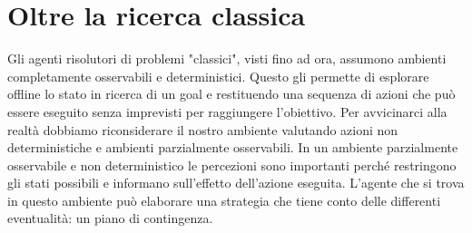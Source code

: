 \documentclass{article}
\begin{document}
\section{Oltre la ricerca classica}
Gli agenti risolutori di problemi "classici", visti fino ad ora, assumono ambienti completamente osservabili e deterministici. Questo gli permette di esplorare offline lo stato in ricerca di un goal e restituendo una sequenza di azioni che può essere eseguito senza imprevisti per raggiungere l'obiettivo. Per avvicinarci alla realtà dobbiamo riconsiderare il nostro ambiente valutando azioni non deterministiche e ambienti parzialmente osservabili. \newline
In un ambiente parzialmente osservabile e non deterministico le percezioni sono importanti perché restringono gli stati possibili e informano sull'effetto dell'azione eseguita. L'agente che si trova in questo ambiente può elaborare una strategia che tiene conto delle differenti eventualità: un piano di contingenza.
\end{document}
